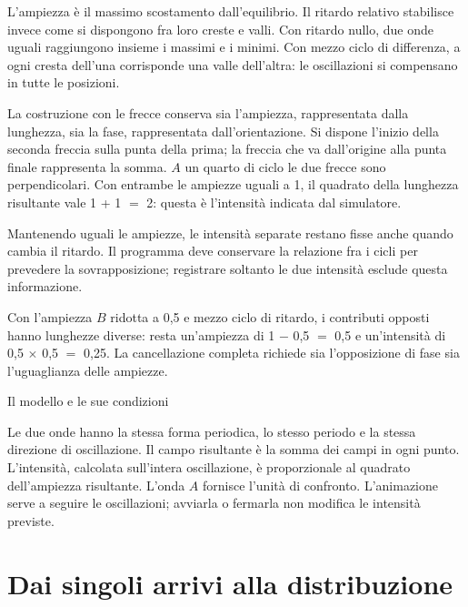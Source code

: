 L'ampiezza è il massimo scostamento dall'equilibrio. Il ritardo relativo stabilisce invece come si dispongono fra loro creste e valli. Con ritardo nullo, due onde uguali raggiungono insieme i massimi e i minimi. Con mezzo ciclo di differenza, a ogni cresta dell'una corrisponde una valle dell'altra: le oscillazioni si compensano in tutte le posizioni.\par

La costruzione con le frecce conserva sia l'ampiezza, rappresentata dalla lunghezza, sia la fase, rappresentata dall'orientazione. Si dispone l'inizio della seconda freccia sulla punta della prima; la freccia che va dall'origine alla punta finale rappresenta la somma. \(A\) un quarto di ciclo le due frecce sono perpendicolari. Con entrambe le ampiezze uguali a 1, il quadrato della lunghezza risultante vale 1 + 1 \(=\) 2: questa è l'intensità indicata dal simulatore.\par

Mantenendo uguali le ampiezze, le intensità separate restano fisse anche quando cambia il ritardo. Il programma deve conservare la relazione fra i cicli per prevedere la sovrapposizione; registrare soltanto le due intensità esclude questa informazione.\par

Con l'ampiezza \(B\) ridotta a 0,5 e mezzo ciclo di ritardo, i contributi opposti hanno lunghezze diverse: resta un'ampiezza di 1 \(- \) 0,5 \(=\) 0,5 e un'intensità di 0,5 \(\times\) 0,5 \(=\) 0,25. La cancellazione completa richiede sia l'opposizione di fase sia l'uguaglianza delle ampiezze.\par


Il modello e le sue condizioni\par

Le due onde hanno la stessa forma periodica, lo stesso periodo e la stessa direzione di oscillazione. Il campo risultante è la somma dei campi in ogni punto. L'intensità, calcolata sull'intera oscillazione, è proporzionale al quadrato dell'ampiezza risultante. L'onda \(A\) fornisce l'unità di confronto. L'animazione serve a seguire le oscillazioni; avviarla o fermarla non modifica le intensità previste.\par




\Needspace{.43\textheight}
\section{Dai singoli arrivi alla distribuzione}
\label{c1-fenditure}

